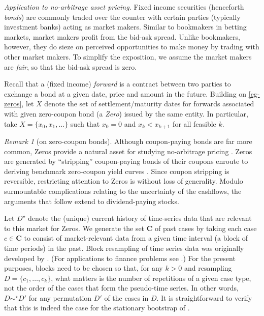 \documentclass[ecta,nameyear,draft]{econsocart}
\newcommand{\mbbc}{{\mathbf C}}
\newcommand{\past}{{D^\star}}
\theoremstyle{plain}
\theoremstyle{remark}
\newtheorem*{remark*}{Remark}
\begin{document}
\emph{Application to no-arbitrage asset pricing.} %
Fixed income securities (henceforth \emph{bonds}) are commonly traded over the
counter with certain parties (typically investment banks) acting as market
makers. Similar to bookmakers in betting markets, market makers profit from the
bid-ask spread. Unlike bookmakers, however, they do sieze on perceived
opportunities to make money by trading with other market makers. To simplify
the exposition, we assume the market makers are \emph{fair}, so that the
bid-ask spread is zero.

Recall that a (fixed income) \emph{forward} is a contract between two parties
to exchange a bond at a given date, price and amount in the future.  Building
on \cref{eg-zeros}, let $X$ denote the set of settlement/maturity dates for
forwards associated with given zero-coupon bond (a \emph{Zero}) issued by the
same entity. In particular, take $X = \{x_0, x_1, \dots\}$ such that $x_0 = 0$
and $x_k < x_{k + 1}$ for all feasible $k$. 
\begin{remark*}[on zero-coupon bonds] Although coupon-paying bonds are far more
  common, Zeros provide a natural asset for studying no-arbitrage pricing
  \citep{barillas2019speculation}. Zeros are generated by ``stripping''
  coupon-paying bonds of their coupons enroute to deriving benchmark
  zero-coupon yield curves \citep{brealey2020principles}. Since coupon
  stripping is reversible, restricting attention to Zeros is without loss of
  generality. Modulo surmountable complications relating to the uncertainty of
  the cashflows, the arguments that follow extend to dividend-paying stocks.
\end{remark*}

Let $\past$ denote the (unique) current history of time-series data that are
relevant to this market for Zeros.  We generate the set $\mbbc$ of past cases
by taking each case $c \in \mbbc$ to consist of market-relevant data from a
given time interval (a block of time periods) in the past. Block resampling of
time series data was originally developed by
\citet{kunsch1989jackknife,politis1994stationary}. (For applications to finance
problems see \citet{white2000reality,harvey2021lucky}.) For the present
purposes, blocks need to be chosen so that, for any $k > 0$ and resampling $D =
\{c_1, \dots, c_k\}$, what matters is the number of repetitions of a given case
type, not the order of the cases that form the pseudo-time series. In other
words, $D \sim^\star D'$ for any permutation $D'$ of the cases in $D$.  It is
straightforward to verify that this is indeed the case for the stationary
bootstrap of \citet[section 2]{politis1994stationary}.
\end{document}
